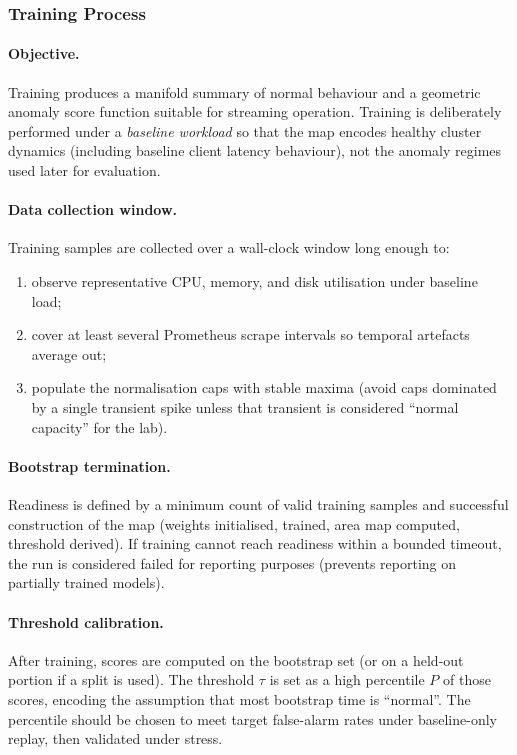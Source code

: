 \documentclass[11pt,a4paper]{article}
\begin{document}
\subsubsection{Training Process}
\label{subsubsec:som-train-process}

\paragraph{Objective.}
Training produces a manifold summary of normal behaviour and a geometric anomaly score function suitable for streaming operation. Training is deliberately performed under a \emph{baseline workload} so that the map encodes healthy cluster dynamics (including baseline client latency behaviour), not the anomaly regimes used later for evaluation.

\paragraph{Data collection window.}
Training samples are collected over a wall-clock window long enough to:
\begin{enumerate}[leftmargin=*]
  \item observe representative CPU, memory, and disk utilisation under baseline load;
  \item cover at least several Prometheus scrape intervals so temporal artefacts average out;
  \item populate the normalisation caps with stable maxima (avoid caps dominated by a single transient spike unless that transient is considered ``normal capacity'' for the lab).
\end{enumerate}

\paragraph{Bootstrap termination.}
Readiness is defined by a minimum count of valid training samples and successful construction of the map (weights initialised, trained, area map computed, threshold derived). If training cannot reach readiness within a bounded timeout, the run is considered failed for reporting purposes (prevents reporting on partially trained models).

\paragraph{Threshold calibration.}
After training, scores are computed on the bootstrap set (or on a held-out portion if a split is used). The threshold $\tau$ is set as a high percentile $P$ of those scores, encoding the assumption that most bootstrap time is ``normal''. The percentile should be chosen to meet target false-alarm rates under baseline-only replay, then validated under stress.
\end{document}
